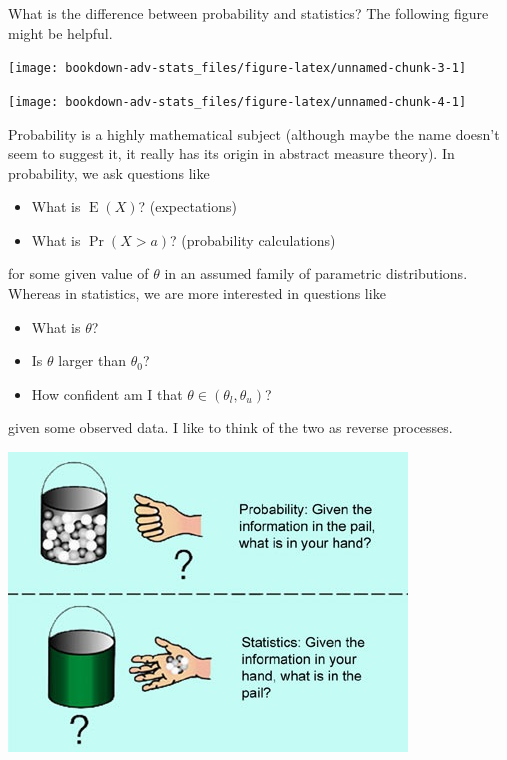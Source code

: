 \documentclass[
]{book}
\providecommand{\tightlist}{%
  \setlength{\itemsep}{0pt}\setlength{\parskip}{0pt}}
\DeclareMathOperator{\E}{E}
\theoremstyle{definition}
\theoremstyle{definition}
\theoremstyle{definition}
\theoremstyle{definition}
\theoremstyle{remark}
\begin{document}
What is the difference between probability and statistics? The following figure might be helpful.

\begin{center}\texttt{[image: bookdown-adv-stats\_files/figure-latex/unnamed-chunk-3-1]} \end{center}

\begin{center}\texttt{[image: bookdown-adv-stats\_files/figure-latex/unnamed-chunk-4-1]} \end{center}

Probability is a highly mathematical subject (although maybe the name doesn't seem to suggest it, it really has its origin in abstract measure theory). In probability, we ask questions like

\begin{itemize}
\tightlist
\item
  What is \(\E(X)\)? (expectations)
\item
  What is \(\Pr(X > a)\)? (probability calculations)
\end{itemize}

for some given value of \(\theta\) in an assumed family of parametric distributions.
Whereas in statistics, we are more interested in questions like

\begin{itemize}
\tightlist
\item
  What is \(\theta\)?
\item
  Is \(\theta\) larger than \(\theta_0\)?
\item
  How confident am I that \(\theta \in (\theta_l,\theta_u)\)?
\end{itemize}

given some observed data. I like to think of the two as reverse processes.

\begin{center}\includegraphics[width=0.8\linewidth]{figure/00-probstats} \end{center}
\end{document}
